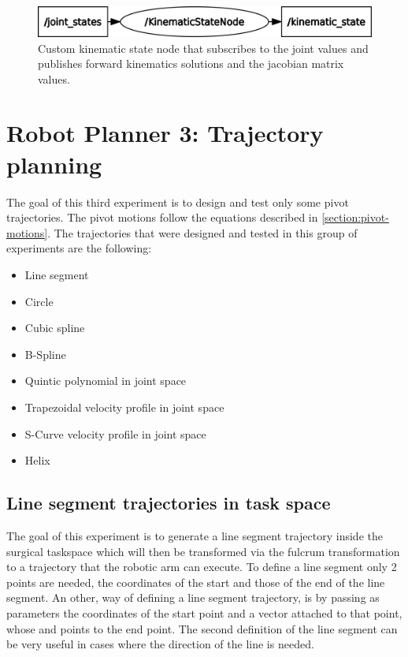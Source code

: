 \begin{center}
\begin{figure}[!htb]
\centering
\includegraphics[width=\textwidth]{images/kinematic_state_topic_graph.png}
\caption{Custom kinematic state node that subscribes to the joint values and publishes forward kinematics solutions and the jacobian matrix values.}
\label{kinematic-state-topic-graph}
\end{figure}
\end{center}


\section{Robot Planner 3: Trajectory planning}

The goal of this third experiment is to design and test only some pivot trajectories. The pivot motions follow the equations described in 
\ref{section:pivot-motions}. The trajectories that were designed and tested in this group of experiments are the following:
\begin{itemize}
\item Line segment
\item Circle
\item Cubic spline
\item B-Spline
\item Quintic polynomial in joint space
\item Trapezoidal velocity profile in joint space
\item S-Curve velocity profile in joint space
\item Helix
\end{itemize}

\subsection{Line segment trajectories in task space}
\label{section:robot-planner3b}

The goal of this experiment is to generate a line segment trajectory inside the surgical
taskspace which will then be transformed via the fulcrum transformation to a trajectory that the robotic arm can execute. To define a line segment only 
2 points are needed, the coordinates of the start and those of the end of the line segment. An other, way of defining a line segment trajectory, 
is by passing as parameters the coordinates of the start point and a vector attached to that point, whose and points to the end point. The second definition 
of the line segment can be very useful in cases where the direction of the line is needed.

